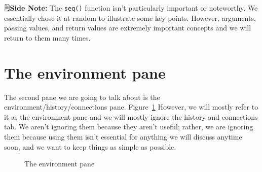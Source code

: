 \documentclass[
  letterpaper,
  DIV=11,
  numbers=noendperiod]{scrreprt}
\begin{document}
\begin{tcolorbox}[enhanced jigsaw, colbacktitle=quarto-callout-note-color!10!white, colback=white, opacitybacktitle=0.6, leftrule=.75mm, left=2mm, rightrule=.15mm, bottomrule=.15mm, breakable, bottomtitle=1mm, colframe=quarto-callout-note-color-frame, titlerule=0mm, toptitle=1mm, coltitle=black, opacityback=0, arc=.35mm, title=\textcolor{quarto-callout-note-color}{\faInfo}\hspace{0.5em}{Note}, toprule=.15mm]

🗒\textbf{Side Note:} The \texttt{seq()} function isn't particularly
important or noteworthy. We essentially chose it at random to illustrate
some key points. However, arguments, passing values, and return values
are extremely important concepts and we will return to them many times.

\end{tcolorbox}

\section{The environment pane}\label{the-environment-pane}

The second pane we are going to talk about is the
environment/history/connections pane. Figure~\ref{fig-environment-pane}
However, we will mostly refer to it as the environment pane and we will
mostly ignore the history and connections tab. We aren't ignoring them
because they aren't useful; rather, we are ignoring them because using
them isn't essential for anything we will discuss anytime soon, and we
want to keep things as simple as possible.

\begin{figure}


\caption{\label{fig-environment-pane}The environment pane}

\end{figure}%
\end{document}
